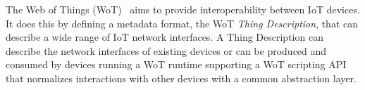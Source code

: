 The Web of Things (WoT)~\cite{Wot2017arch} aims to provide interoperability between IoT devices.
It does this by defining a metadata format,
the WoT \emph{Thing Description}, that can describe 
a wide range of IoT network interfaces.
A Thing Description can describe the network interfaces of existing devices
or can be produced and consumed by devices running a WoT runtime supporting a WoT scripting
API that normalizes interactions with other devices with a common abstraction layer.
